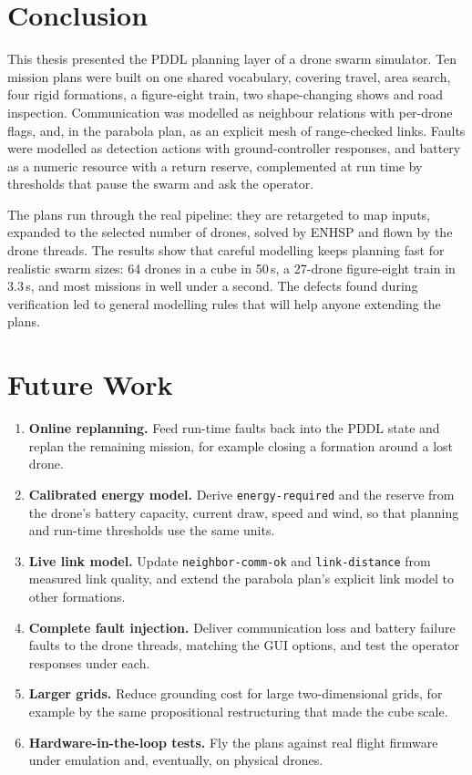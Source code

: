 \documentclass[11pt,a4paper,oneside]{report}
\newcommand{\code}[1]{\texttt{#1}}
\begin{document}
\section{Conclusion}
This thesis presented the PDDL planning layer of a drone swarm simulator. Ten mission plans were
built on one shared vocabulary, covering travel, area search, four rigid formations, a
figure-eight train, two shape-changing shows and road inspection. Communication was modelled as
neighbour relations with per-drone flags, and, in the parabola plan, as an explicit mesh of
range-checked links. Faults were modelled as detection actions with ground-controller responses,
and battery as a numeric resource with a return reserve, complemented at run time by thresholds
that pause the swarm and ask the operator.

The plans run through the real pipeline: they are retargeted to map inputs, expanded to the
selected number of drones, solved by ENHSP and flown by the drone threads. The results show that
careful modelling keeps planning fast for realistic swarm sizes: 64 drones in a cube in 50\,s,
a 27-drone figure-eight train in 3.3\,s, and most missions in well under a second. The defects
found during verification led to general modelling rules that will help anyone extending the
plans.

\section{Future Work}
\begin{enumerate}
  \item \textbf{Online replanning.} Feed run-time faults back into the PDDL state and replan the
        remaining mission, for example closing a formation around a lost drone.
  \item \textbf{Calibrated energy model.} Derive \code{energy-required} and the reserve from the
        drone's battery capacity, current draw, speed and wind, so that planning and run-time
        thresholds use the same units.
  \item \textbf{Live link model.} Update \code{neighbor-comm-ok} and \code{link-distance} from
        measured link quality, and extend the parabola plan's explicit link model to other
        formations.
  \item \textbf{Complete fault injection.} Deliver communication loss and battery failure faults
        to the drone threads, matching the GUI options, and test the operator responses under
        each.
  \item \textbf{Larger grids.} Reduce grounding cost for large two-dimensional grids, for example
        by the same propositional restructuring that made the cube scale.
  \item \textbf{Hardware-in-the-loop tests.} Fly the plans against real flight firmware under
        emulation and, eventually, on physical drones.
\end{enumerate}
\end{document}
